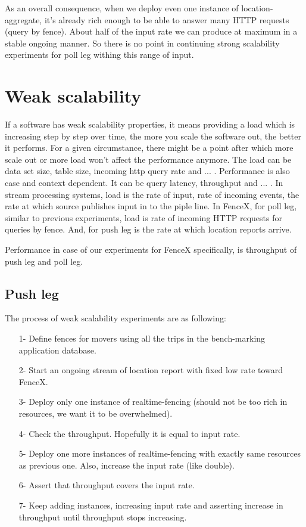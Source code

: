 \documentclass[a4]{report}
\begin{document}
    As an overall consequence, when we deploy even one instance of location-aggregate, it's already rich enough to be
    able to answer many HTTP requests (query by fence).
    About half of the input rate we can produce at maximum in a stable ongoing manner.
    So there is no point in continuing strong scalability experiments for poll leg withing this range of input.


    \section{Weak scalability}
    If a software has weak scalability properties, it means providing a load which is increasing step by step over
    time, the more you scale the software out, the better it performs.
    For a given circumstance, there might be a point after which more scale out or more load won't affect
    the performance anymore.
    The load can be data set size, table size, incoming http query rate and ... .
    Performance is also case and context dependent.
    It can be query latency, throughput and ... .
    In stream processing systems, load is the rate of input, rate of incoming events, the rate at
    which source publishes input in to the piple line.
    In FenceX, for poll leg, similar to previous experiments, load is rate of incoming HTTP requests for queries by
    fence.
    And, for push leg is the rate at which location reports arrive.

    Performance in case of our experiments for FenceX specifically, is throughput of push leg and poll leg.

    \subsection{Push leg}
    The process of weak scalability experiments are as following:
    \begin{itemize}
        \item[1-] Define fences for movers using all the trips in the bench-marking application database.
        \item[2-] Start an ongoing stream of location report with fixed low rate toward FenceX.
        \item[3-] Deploy only one instance of realtime-fencing (should not be too rich in resources, we want it to
        be overwhelmed).
        \item[4-] Check the throughput. Hopefully it is equal to input rate.
        \item[5-] Deploy one more instances of realtime-fencing with exactly same resources as previous one. Also,
        increase the input rate (like double).
        \item[6-] Assert that throughput covers the input rate.
        \item[7-] Keep adding instances, increasing input rate and asserting increase in throughput until throughput
        stops increasing.
    \end{itemize}
\end{document}
